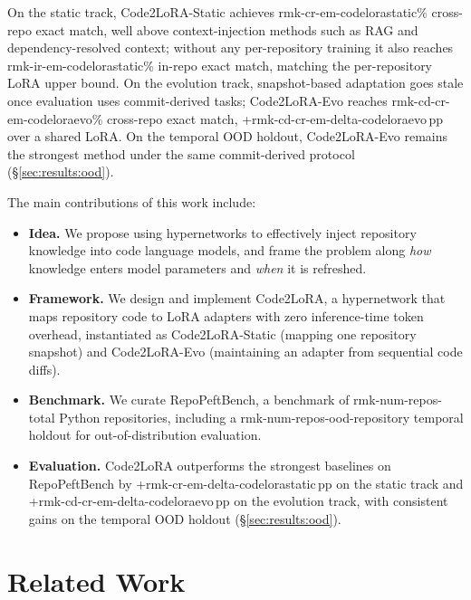 \documentclass[11pt]{article}
\newcommand{\UseMacro}[1]{\csname rmk-#1\endcsname}
\newcommand{\codelora}{Code2LoRA\xspace}
\newcommand{\repopeftbench}{RepoPeftBench\xspace}
\newcommand{\codelorastatic}{\codelora-Static\xspace}
\newcommand{\codeloraevo}{\codelora-Evo\xspace}
\begin{document}
On the static track, \codelorastatic{} achieves \UseMacro{cr-em-codelorastatic}\% cross-repo exact match, well above context-injection methods such as RAG and dependency-resolved context; without any per-repository training it also reaches \UseMacro{ir-em-codelorastatic}\% in-repo exact match, matching the per-repository LoRA upper bound.
On the evolution track, snapshot-based adaptation goes stale once evaluation uses commit-derived tasks; \codeloraevo{} reaches \UseMacro{cd-cr-em-codeloraevo}\% cross-repo exact match, +\UseMacro{cd-cr-em-delta-codeloraevo}\,pp over a shared LoRA.
On the temporal OOD holdout, \codeloraevo{} remains the strongest method under the same commit-derived protocol (\S\ref{sec:results:ood}).

\vspace{3pt}
\noindent
The main contributions of this work include:

\begin{itemize}[topsep=3pt,itemsep=1ex,partopsep=0ex,parsep=0ex,leftmargin=*]
\item \textbf{Idea.}
We propose using hypernetworks to effectively inject repository knowledge into code language models, and frame the problem along \emph{how} knowledge enters model parameters and \emph{when} it is refreshed.
\item \textbf{Framework.}
We design and implement \codelora{}, a hypernetwork that maps repository code to LoRA adapters with zero inference-time token overhead, instantiated as \codelorastatic{} (mapping one repository snapshot) and \codeloraevo{} (maintaining an adapter from sequential code diffs).
\item \textbf{Benchmark.}
We curate \repopeftbench{}, a benchmark of \UseMacro{num-repos-total} Python repositories, including a \UseMacro{num-repos-ood}-repository temporal holdout for out-of-distribution evaluation.
\item \textbf{Evaluation.}
\codelora{} outperforms the strongest baselines on \repopeftbench{} by +\UseMacro{cr-em-delta-codelorastatic}\,pp on the static track and +\UseMacro{cd-cr-em-delta-codeloraevo}\,pp on the evolution track, with consistent gains on the temporal OOD holdout (\S\ref{sec:results:ood}).
\end{itemize}




\section{Related Work}
\label{sec:related}
\end{document}
